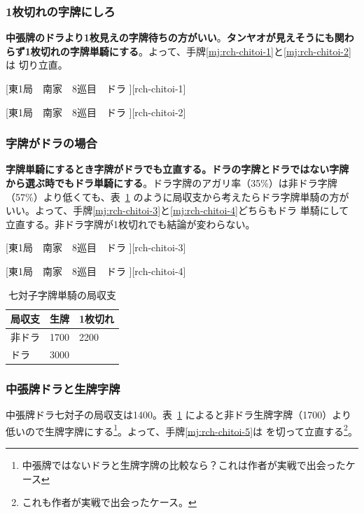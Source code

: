 \documentclass[10pt, twocolumn]{article}
\begin{document}
\subsubsection*{1枚切れの字牌にしろ}

\textbf{中張牌のドラより1枚見えの字牌待ちの方がいい}\citep[][pp. 109--110]{miinin-choice}。\textbf{タンヤオが見えそうにも関わらず1枚切れの字牌単騎にする}\citep[][pp. 111-112]{miinin-choice}。よって、手牌\ref{mj:rch-chitoi-1}と\ref{mj:rch-chitoi-2}は  切り立直。

[東1局　南家　8巡目　ドラ ][rch-chitoi-1]

[東1局　南家　8巡目　ドラ ][rch-chitoi-2]

\subsubsection*{字牌がドラの場合}

\textbf{字牌単騎にするとき字牌がドラでも立直する。ドラの字牌とドラではない字牌から選ぶ時でもドラ単騎にする}\citep[][pp.~113--114]{miinin-choice}。ドラ字牌のアガリ率（35\%）は非ドラ字牌（57\%）より低くても、表~\ref{tab:ev-chitoi} のように局収支から考えたらドラ字牌単騎の方がいい。よって、手牌\ref{mj:rch-chitoi-3}と\ref{mj:rch-chitoi-4}どちらもドラ  単騎にして立直する。非ドラ字牌が1枚切れでも結論が変わらない。

[東1局　南家　8巡目　ドラ ][rch-chitoi-3]

[東1局　南家　8巡目　ドラ ][rch-chitoi-4]

\begin{table}[ht]
  \centering
  \begin{tabular}{l|ll}
    局収支 & 生牌 & 1枚切れ \\
    \hline
    非ドラ & 1700 & 2200 \\
    ドラ　 & 3000 &  \\
  \end{tabular}
  \caption{七対子字牌単騎の局収支}
  \label{tab:ev-chitoi}
\end{table}

\subsubsection*{中張牌ドラと生牌字牌}

中張牌ドラ七対子の局収支は1400\citep[][p.~110]{miinin-choice}。表~\ref{tab:ev-chitoi} によると非ドラ生牌字牌（1700）より低いので生牌字牌にする\footnote{中張牌ではないドラと生牌字牌の比較なら？これは作者が実戦で出会ったケース}。よって、手牌\ref{mj:rch-chitoi-5}は  を切って立直する\footnote{これも作者が実戦で出会ったケース。}。
\end{document}
